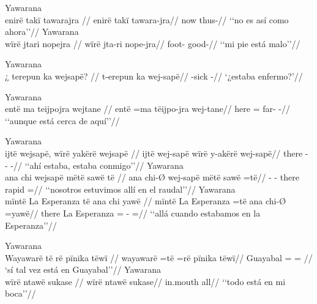 \documentclass{memoir}
\begin{document}
\pex\label{temp-main-neg-nsubj-advpred-jra}    \a Yawarana\\
    \label{convestsjm-34}        \begingl
        \glpreamble enirë takï tawarajra //
        \gla enirë takï tawara-jra//
        \glb now  thus-//
            \glft ‘‘no es así como ahora’’//  
        \endgl 
    \a Yawarana\\
    \label{histaccigrme-2}        \begingl
        \glpreamble wïrë jtari nopejra //
        \gla wïrë jta-ri nope-jra//
        \glb {} foot- good-//
            \glft ‘‘mi pie está malo’’//  
        \endgl 
\xe

\ex Yawarana \\
\label{temp-main-q-npred-cop}    \begingl
    \glpreamble ¿ terepun ka wejsapë? //
    \gla t-erepun ka wej-sapë//
    \glb {}-sick  -//
        \glft ‘¿estaba enfermo?’//  
    \endgl 
\xe

\ex Yawarana \\
\label{loc-main-aff-advpred-nsubj-cop}    \begingl
    \glpreamble entë ma teijpojra wejtane //
    \gla entë =ma tëijpo-jra wej-tane//
    \glb here = far- -//
        \glft ‘‘aunque está cerca de aquí’’//  
    \endgl 
\xe

\pex\label{loc-main-aff-locpred-cop-nsubj}    \a Yawarana\\
    \label{convfemgrme-292}        \begingl
        \glpreamble ijtë wejsapë, wïrë yakërë wejsapë //
        \gla ijtë wej-sapë wïrë y-akërë wej-sapë//
        \glb there -  - -//
            \glft ‘‘ahí estaba, estaba conmigo’’//  
        \endgl 
    \a Yawarana\\
    \label{histgrme-107}        \begingl
        \glpreamble ana chi wejsapë mëtë sawë të //
        \gla ana chi-Ø wej-sapë mëtë sawë =të//
        \glb {} - - there rapid =//
            \glft ‘‘nosotros estuvimos allí en el raudal’’//  
        \endgl 
    \a Yawarana\\
    \label{convamgu-127}        \begingl
        \glpreamble mïntë La Esperanza të ana chi yawë //
        \gla mïntë La Esperanza =të ana chi-Ø =yawë//
        \glb there La Esperanza =  - =//
            \glft ‘‘allá cuando estabamos en la Esperanza’’//  
        \endgl 
\xe

\pex\label{loc-main-aff-locpred-nsubj}    \a Yawarana\\
    \label{convamgu-80}        \begingl
        \glpreamble Wayawarë të rë pïnika tëwï //
        \gla wayawarë =të =rë pïnika tëwï//
        \glb Guayabal = =  //
            \glft ‘sí tal vez está en Guayabal’’//  
        \endgl 
    \a Yawarana\\
    \label{histyarirdi-339}        \begingl
        \glpreamble wïrë ntawë sukase //
        \gla wïrë ntawë sukase//
        \glb {} in.mouth all//
            \glft ‘‘todo está en mi boca’’//  
        \endgl 
\xe
\end{document}
